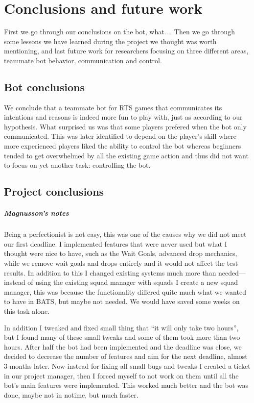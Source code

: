 \chapter{Conclusions and future work}
First we go through our conclusions on the bot, what.... Then we go through some lessons we have learned during the project we thought was worth mentioning, and last future work for researchers focusing on three different areas, teammate bot behavior, communication and control.

\section{Bot conclusions}
We conclude that a teammate bot for RTS games that communicates its intentions and reasons is indeed more fun to play with, just as according to our hypothesis. What surprised us was that some players prefered when the bot only communicated. This was later identified to depend on the player's skill where more experienced players liked the ability to control the bot whereas beginners tended to get overwhelmed by all the existing game action and thus did not want to focus on yet another task: controlling the bot.

\section{Project conclusions}
\paragraph{Magnusson's notes}
Being a perfectionist is not easy, this was one of the causes why we did not meet our first deadline. I implemented features that were never used but what I thought were nice to have, such as the Wait Goals, advanced drop mechanics, while we remove wait goals and drops entirely and it would not affect the test results. In addition to this I changed existing systems much more than needed—instead of using the existing squad manager with squads I create a new squad manager, this was because the functionality differed quite much what we wanted to have in BATS, but maybe not needed. We would have saved some weeks on this task alone.

In addition I tweaked and fixed small thing that ``it will only take two hours'', but I found many of these small tweaks and some of them took more than two hours. After half the bot had been implemented and the deadline was close, we decided to decrease the number of features and aim for the next deadline, almost 3 months later. Now instead for fixing all small bugs and tweaks I created a ticket in our project manager, then I forced myself to not work on them until all the bot's main features were implemented. This worked much better and the bot was done, maybe not in notime, but much faster.

